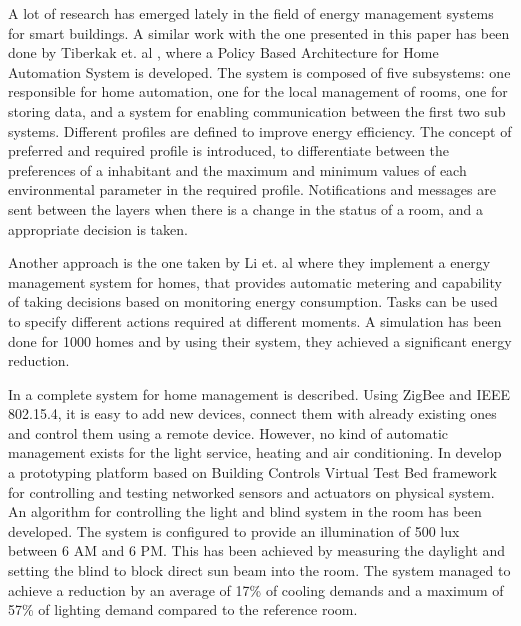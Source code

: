 \label{chap:relatedwork}
A lot of research has emerged lately in the field of energy management systems for smart buildings. 
A similar work with the one presented in this paper has been done by Tiberkak et. al \cite{Tiberkak10}, where a Policy Based Architecture for Home Automation
System is developed. The system is composed of five subsystems: one responsible
for home automation, one for the local management of rooms, one
for storing data, and a system for enabling communication between the first
two sub systems. Different profiles are defined to improve energy efficiency.
The concept of preferred and required profile is introduced, to differentiate
between the preferences of a inhabitant and the maximum and minimum values
of each environmental parameter in the required profile. Notifications
and messages are sent between the layers when there is a change in the
status of a room, and a appropriate decision is taken.

Another approach is the one taken by Li et. al \cite{Li11} where they implement a energy management system for homes, that provides automatic metering and capability of taking decisions based on monitoring energy consumption. 
Tasks can be used to specify different actions required at different moments. A simulation has been done for 1000 homes and by using their system, they achieved a significant energy reduction.

In \cite{Han10} a complete system for home management is described. Using ZigBee and IEEE 802.15.4, it is easy to add new devices, connect them with already existing ones and control them using a remote device. However, no kind of automatic management exists for the light service, heating and air conditioning. In \cite{Wen11} develop a prototyping platform based on Building Controls Virtual Test Bed framework \cite{Bcvtb} for controlling and testing networked sensors and actuators on physical system. An algorithm for controlling the light and blind system in the room has been developed. The system is configured to provide an illumination of 500 lux between 6 AM and 6 PM. This has been achieved by measuring the daylight and setting the blind to block direct sun beam into the room. The system managed to achieve a reduction by an average of 17\% of cooling demands and a maximum of 57\% of lighting demand compared to the reference room.